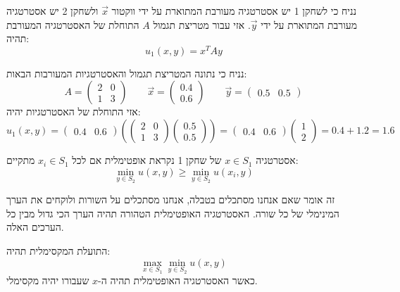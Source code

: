 \documentclass{tstextbook}
\begin{document}
\begin{definition}
נניח כי לשחקן 1 יש אסטרטגיה מעורבת המתוארת על ידי ווקטור \(\vec{x}\) ולשחקן 2 יש אסטרטגיה מעורבת המתוארת על ידי \(\vec{y}\). אזי עבור מטריצת תגמול \(A\) התוחלת של האסטרטגיה המעורבת תהיה:
$$u_{1}(x,y)=x^{T}A y$$

\end{definition}
\begin{example}
נניח כי נתונה המטריצת תגמול והאסטרטגיות המעורבות הבאות:
$$A=\begin{pmatrix}2 & 0 \\1 & 3\end{pmatrix}\qquad \vec{x}=\begin{pmatrix}0.4 \\ 0.6\end{pmatrix}\qquad \vec{y}=\begin{pmatrix}0.5 & 0.5
\end{pmatrix}$$
אזי התוחלת של האסטרטגיות יהיה:
$$u_{1}(x,y)=\begin{pmatrix}0.4&0.6\end{pmatrix}\left( \begin{pmatrix}2 & 0 \\1 & 3\end{pmatrix} \begin{pmatrix}0.5\\0.5\end{pmatrix}\right)=\begin{pmatrix}0.4 & 0.6\end{pmatrix}\begin{pmatrix}1\\2
\end{pmatrix}=0.4+1.2=1.6$$

\end{example}
\begin{definition}
אסטרטגיה \(x \in S_{1}\) של שחקן 1 נקראת אופטימלית אם לכל \(x_{i}\in S_{1}\) מתקיים:
$$\min _{y \in S_{2}}u(x,y)\geq \min _{y \in S_{2}}u(x_{i},y)$$

\end{definition}
\begin{remark}
זה אומר שאם אנחנו מסתכלים בטבלה, אנחנו מסתכלים על השורות ולוקחים את הערך המינימלי של כל שורה. האסטרטגיה האופטימלית הטהורה תהיה הערך הכי גדול מבין כל הערכים האלה.

\end{remark}
\begin{corollary}
התועלת המקסימלית תהיה:
$$\max _{x \in S_{1}}\min _{y\in S_{2}}u(x,y)$$
כאשר האסטרטגיה האופטימלית תהיה ה-\(x\) שעבורו יהיה מקסימלי.

\end{corollary}
\end{document}
